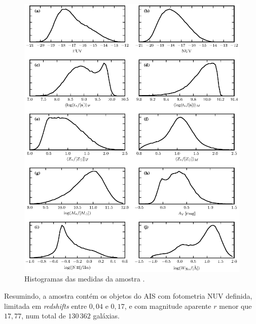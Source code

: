 \begin{figure}
	\includegraphics{figuras/histogram-sample.eps}
	\caption[Histogramas das medidas da amostra \starlightUV.]
	{Histogramas das medidas da amostra \starlightUV.}
	\label{fig:HistogramasAmostra}
\end{figure}

Resumindo, a amostra \starlightUV contém os objetos do AIS com fotometria NUV
definida, limitada em {\em redshifts} entre $0,04$ e $0,17$, e com magnitude
aparente $r$ menor que $17,77$, num total de $130\,362$ galáxias.


